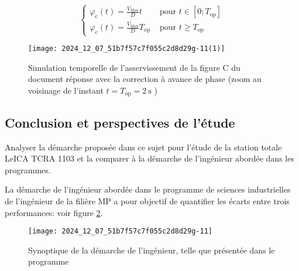 $$
\begin{cases}\varphi_{\mathrm{c}}(t)=\frac{V_{\mathrm{Max}}}{D} t & \text { pour } t \in\left[0 ; T_{\mathrm{op}}\right] \\ \varphi_{\mathrm{c}}(t)=\frac{V_{\mathrm{Max}}}{D} T_{\mathrm{op}} & \text { pour } t \geqslant T_{\mathrm{op}}\end{cases}
$$

\begin{figure}[!h]
\centering
\texttt{[image: 2024\_12\_07\_51b7f57c7f055c2d8d29g-11(1)]}

\caption{Simulation temporelle de l'asservissement de la figure C du document réponse avec la correction à avance de phase (zoom au voisinage de l'instant $t=T_{\mathrm{op}}=2 \mathrm{~s}$ )
\label{CCS_MP_2017:fig_14}}
\end{figure}

\ifprof
\begin{corrige}
\end{corrige}
\else
\fi


\subsection{Conclusion et perspectives de l'étude}
\begin{obj}
Analyser la démarche proposée dans ce sujet pour l'étude de la station totale LeICA TCRA 1103 et la comparer à la démarche de l'ingénieur abordée dans les programmes.%
\end{obj}

La démarche de l'ingénieur abordée dans le programme de sciences industrielles de l'ingénieur de la filière MP a pour objectif de quantifier les écarts entre trois performances: voir figure \ref{CCS_MP_2017:fig_15}.\\

\begin{figure}[!h]
\centering
\texttt{[image: 2024\_12\_07\_51b7f57c7f055c2d8d29g-11]}

\caption{Synoptique de la démarche de l'ingénieur, telle que présentée dans le programme\\
\label{CCS_MP_2017:fig_15}}
\end{figure}

\ifprof
\begin{corrige}
\end{corrige}
\else
\fi


